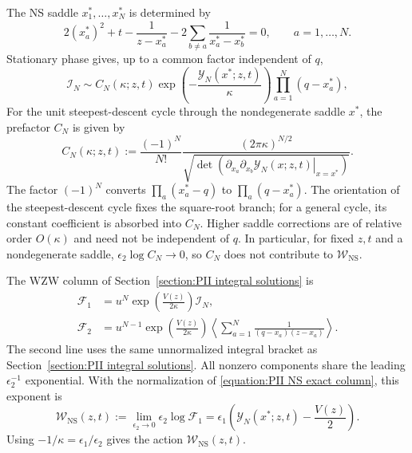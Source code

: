 \documentclass[a4paper,11pt]{article}
\newcommand{\cF}{\mathcal{F}}
\numberwithin{equation}{section}
\begin{document}
The NS saddle $x_{1}^{*},\ldots,x_{N}^{*}$ is determined by
\begin{equation}
	\label{equation:PII NS Bethe equations}
	2(x_{a}^{*})^{2}+t
	-\frac{1}{z-x_{a}^{*}}
	-2\sum_{b\ne a}\frac{1}{x_{a}^{*}-x_{b}^{*}}=0,
	\qquad a=1,\ldots,N.
\end{equation}
Stationary phase gives, up to a common factor independent of $q$,
\begin{equation}
	\label{equation:PII NS integral stationary phase}
	\mathcal{I}_{N}
	\sim C_{N}(\kappa;z,t)
	\exp\left(-\frac{\mathcal{Y}_{N}(x^{*};z,t)}{\kappa}\right)
	\prod_{a=1}^{N}(q-x_{a}^{*}),
\end{equation}
For the unit steepest-descent cycle through the nondegenerate saddle
$x^{*}$, the prefactor $C_N$ is given by
\begin{equation}
	C_{N}(\kappa;z,t)
	:=\frac{(-1)^{N}}{N!}
	\frac{(2\pi\kappa)^{N/2}}
	{\sqrt{\det\left(
			\left.\partial_{x_{a}}\partial_{x_{b}}
			\mathcal{Y}_{N}(x;z,t)\right|_{x=x^{*}}
			\right)}}.
\end{equation}
The factor $(-1)^{N}$ converts
$\prod_{a}(x_{a}^{*}-q)$ to $\prod_{a}(q-x_{a}^{*})$.
The orientation of the steepest-descent cycle fixes the square-root
branch; for a general cycle, its constant coefficient is
absorbed into $C_{N}$.  Higher saddle corrections are of relative
order $O(\kappa)$ and need not be independent of $q$.  In particular,
for fixed $z,t$ and a nondegenerate saddle,
$\epsilon_{2}\log C_{N}\to0$, so $C_{N}$ does not contribute to
$\mathcal{W}_{\mathrm{NS}}$.


The WZW column of Section~\ref{section:PII integral solutions} is
\begin{equation}
	\label{equation:PII NS exact column}
	\begin{aligned}
		\cF_{1}&=u^{N}\exp\left(\frac{V(z)}{2\kappa}\right)\mathcal{I}_{N},\\
		\cF_{2}&=u^{N-1}\exp\left(\frac{V(z)}{2\kappa}\right)
		\left\langle\sum_{a=1}^{N}
		\frac{1}{(q-x_{a})(z-x_{a})}\right\rangle.
	\end{aligned}
\end{equation}
The second line uses the same unnormalized integral bracket as
Section~\ref{section:PII integral solutions}.  All nonzero components
share the leading $\epsilon_{2}^{-1}$ exponential.  With the normalization of
\eqref{equation:PII NS exact column}, this exponent is
\begin{equation}
	\mathcal{W}_{\mathrm{NS}}(z,t)
	:=\lim_{\epsilon_{2}\to0}\epsilon_{2}\log\cF_{1}
	=\epsilon_{1}\left(
	\mathcal{Y}_{N}(x^{*};z,t)-\frac{V(z)}{2}\right).
\end{equation}
Using $-1/\kappa=\epsilon_{1}/\epsilon_{2}$ gives the action
$\mathcal{W}_{\mathrm{NS}}(z,t)$.
\end{document}
